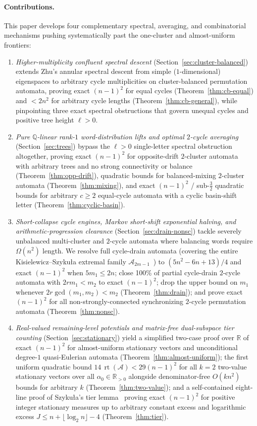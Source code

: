 \documentclass[11pt,a4paper]{article}
\theoremstyle{definition}
\theoremstyle{remark}
\newcommand{\rt}{\operatorname{rt}}
\newcommand{\Q}{\mathbb{Q}}
\newcommand{\R}{\mathbb{R}}
\newcommand{\cA}{\mathcal{A}}
\begin{document}
\paragraph{Contributions.}
This paper develops four complementary spectral, averaging, and combinatorial mechanisms pushing systematically past the one-cluster and almost-uniform frontiers:
\begin{enumerate}[label=\textbf{\arabic*.}]
  \item \emph{Higher-multiplicity confluent spectral descent} (Section~\ref{sec:cluster-balanced}) extends Zhu's annular spectral descent from simple ($1$-dimensional) eigenspaces to arbitrary cycle multiplicities on cluster-balanced permutation automata, proving exact $(n-1)^2$ for equal cycles (Theorem~\ref{thm:cb-equal}) and $< 2n^2$ for arbitrary cycle lengths (Theorem~\ref{thm:cb-general}), while pinpointing three exact spectral obstructions that govern unequal cycles and positive tree height $\ell > 0$.
  \item \emph{Pure $\Q$-linear rank-$1$ word-distribution lifts and optimal $2$-cycle averaging} (Section~\ref{sec:trees}) bypass the $\ell > 0$ single-letter spectral obstruction altogether, proving exact $(n-1)^2$ for opposite-drift $2$-cluster automata with arbitrary trees and no strong connectivity or balance (Theorem~\ref{thm:opp-drift}), quadratic bounds for balanced-mixing $2$-cluster automata (Theorem~\ref{thm:mixing}), and exact $(n-1)^2$ / sub-$\frac{3}{2}$ quadratic bounds for arbitrary $c \ge 2$ equal-cycle automata with a cyclic basin-shift letter (Theorem~\ref{thm:cyclic-basin}).
  \item \emph{Short-collapse cycle engines, Markov short-shift exponential halving, and arithmetic-progression clearance} (Section~\ref{sec:drain-nonsc}) tackle severely unbalanced multi-cluster and $2$-cycle automata where balancing words require $\Omega(n^2)$ length. We resolve full cycle-drain automata (covering the entire Kisielewicz--Szyku\l a extremal family $\cA_{2m-1}$~\cite{KS2015}) to $(5n^2-6n+13)/4$ and exact $(n-1)^2$ when $5m_1 \le 2n$; close 100\% of partial cycle-drain $2$-cycle automata with $2r m_1 < m_2$ to exact $(n-1)^2$; drop the upper bound on $m_1$ whenever $2r\gcd(m_1,m_2) < m_2$ (Theorem~\ref{thm:drain}); and prove exact $(n-1)^2$ for all non-strongly-connected synchronizing $2$-cycle permutation automata (Theorem~\ref{thm:nonsc}).
  \item \emph{Real-valued remaining-level potentials and matrix-free dual-subspace tier counting} (Section~\ref{sec:stationary}) yield a simplified two-case proof over $\R$ of exact $(n-1)^2$ for almost-uniform stationary vectors and unconditional degree-$1$ quasi-Eulerian automata (Theorem~\ref{thm:almost-uniform}); the first uniform quadratic bound $14\,\rt(\cA) < 29(n-1)^2$ for all $k=2$ two-value stationary vectors over all $\alpha_0 \in \R_{>0}$ alongside denominator-free $O(k n^2)$ bounds for arbitrary $k$ (Theorem~\ref{thm:two-value}); and a self-contained eight-line proof of Szyku\l a's tier lemma~\cite{Szykula2026} proving exact $(n-1)^2$ for positive integer stationary measures up to arbitrary constant excess and logarithmic excess $J \le n + \lfloor \log_2 n \rfloor - 4$ (Theorem~\ref{thm:tier}).
\end{enumerate}
\end{document}
